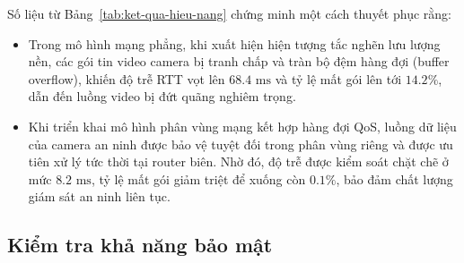 Số liệu từ Bảng~\ref{tab:ket-qua-hieu-nang} chứng minh một cách thuyết phục rằng:
\begin{itemize}
    \item Trong mô hình mạng phẳng, khi xuất hiện hiện tượng tắc nghẽn lưu lượng nền, các gói tin video camera bị tranh chấp và tràn bộ đệm hàng đợi (buffer overflow), khiến độ trễ RTT vọt lên $68.4\text{ ms}$ và tỷ lệ mất gói lên tới $14.2\%$, dẫn đến luồng video bị đứt quãng nghiêm trọng.
    \item Khi triển khai mô hình phân vùng mạng kết hợp hàng đợi QoS, luồng dữ liệu của camera an ninh được bảo vệ tuyệt đối trong phân vùng riêng và được ưu tiên xử lý tức thời tại router biên. Nhờ đó, độ trễ được kiểm soát chặt chẽ ở mức $8.2\text{ ms}$, tỷ lệ mất gói giảm triệt để xuống còn $0.1\%$, bảo đảm chất lượng giám sát an ninh liên tục.
\end{itemize}

\subsection{Kiểm tra khả năng bảo mật}
\label{subsec:kiem-tra-bao-mat}

